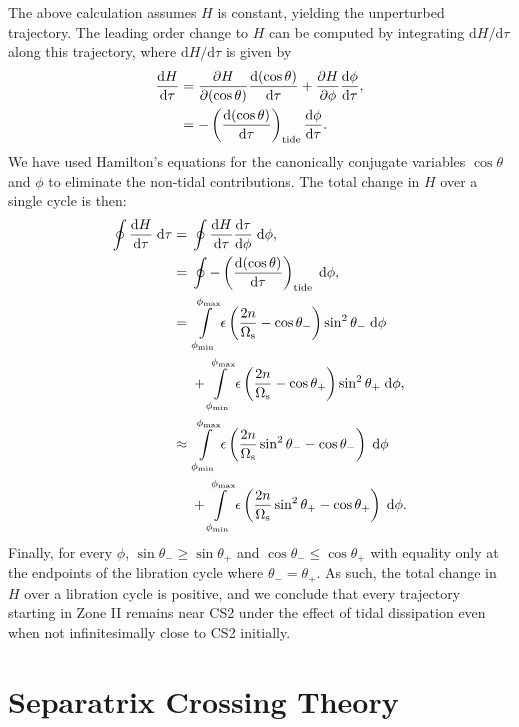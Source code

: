 \documentclass[
        fleqn,
        usenatbib,
    ]{mnras}
\newcommand*{\rd}[2]{\frac{\mathrm{d}#1}{\mathrm{d}#2}}
\newcommand*{\pd}[2]{\frac{\partial#1}{\partial#2}}
\newcommand*{\rdil}[2]{\mathrm{d}#1/\mathrm{d}#2}
\newcommand*{\p}[1]{\left(#1\right)}
\begin{document}
The above calculation assumes $H$ is constant, yielding the unperturbed
trajectory. The leading order change to $H$ can be computed by integrating
$\rdil{H}{\tau}$ along this trajectory, where $\rdil{H}{\tau}$ is given by
\begin{align}
    \rd{H}{\tau} &=
            \pd{H}{(\cos \theta)}\rd{(\cos \theta)}{\tau}
            + \pd{H}{\phi}\rd{\phi}{\tau},\nonumber\\
        &= -\p{\rd{(\cos\theta)}{\tau}}_{\rm tide} \rd{\phi}{\tau}.
            \label{eq:dHdt_toyf}
\end{align}
We have used Hamilton's equations for the canonically conjugate variables $\cos
\theta$ and $\phi$ to eliminate the non-tidal contributions. The total change in
$H$ over a single cycle is then:
\begin{align}
    \oint \rd{H}{\tau}\;\mathrm{d}\tau ={}& \oint \rd{H}{\tau}
        \rd{\tau}{\phi}\;\mathrm{d}\phi,\nonumber\\
        ={}& \oint -\p{\rd{(\cos \theta)}{\tau}}_{\rm tide}
            \;\mathrm{d}\phi,\nonumber\\
        ={}&
            \int\limits_{\phi_{\min}}^{\phi_{\max}}
                \epsilon \p{\frac{2n}{\Omega_{\rm s}} - \cos \theta_-}
                \sin^2\theta_- \;\mathrm{d}\phi\nonumber\\
            &+ \int\limits_{\phi_{\min}}^{\phi_{\max}}
                \epsilon \p{\frac{2n}{\Omega_{\rm s}} - \cos \theta_+}
                \sin^2\theta_+ \;\mathrm{d}\phi,\nonumber\\
        \approx{}&
            \int\limits_{\phi_{\min}}^{\phi_{\max}}
                \epsilon \p{\frac{2n}{\Omega_{\rm s}}\sin^2\theta_- - \cos \theta_-}
                 \;\mathrm{d}\phi\nonumber\\
            &+ \int\limits_{\phi_{\min}}^{\phi_{\max}}
                \epsilon \p{\frac{2n}{\Omega_{\rm s}}\sin^2\theta_+ - \cos \theta_+}
                \;\mathrm{d}\phi.
\end{align}
Finally, for every $\phi$, $\sin \theta_- \geq \sin \theta_+$ and $\cos \theta_-
\leq \cos \theta_+$ with equality only at the endpoints of the libration cycle
where $\theta_- = \theta_+$. As such, the total change in $H$ over a libration
cycle is positive, and we conclude that every trajectory starting in Zone II
remains near CS2 under the effect of tidal dissipation even when not
infinitesimally close to CS2 initially.

\section{Separatrix Crossing Theory}\label{app:sep_crossing_dynamics}
\end{document}
